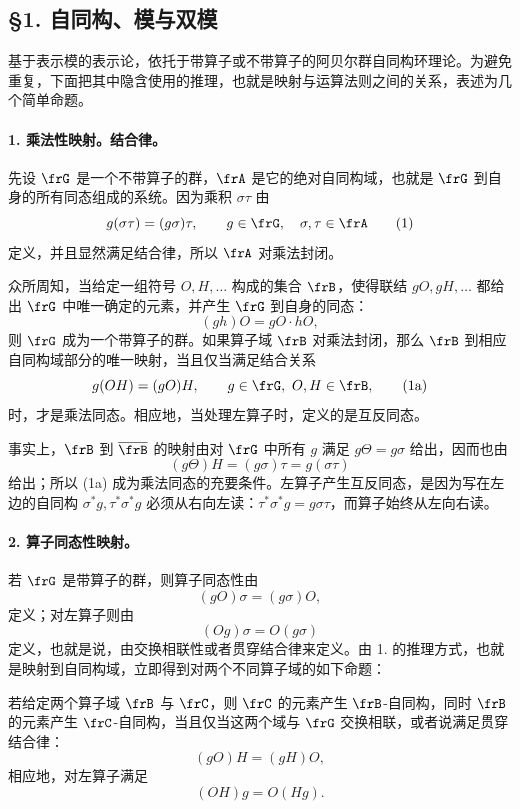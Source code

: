\subsection*{§1. 自同构、模与双模}

基于表示模的表示论，依托于带算子或不带算子的阿贝尔群自同构环理论。为避免重复，下面把其中隐含使用的推理，也就是映射与运算法则之间的关系，表述为几个简单命题。

\paragraph{1. 乘法性映射。结合律。}
先设 \(\frG\) 是一个不带算子的群，\(\frA\) 是它的绝对自同构域，也就是 \(\frG\) 到自身的所有同态组成的系统。因为乘积 \(\sigma\tau\) 由
\[
        g(\sigma\tau)=(g\sigma)\tau,
        \qquad g\in\frG,\quad \sigma,\tau\in\frA                         \tag{1}
\]
定义，并且显然满足结合律，所以 \(\frA\) 对乘法封闭。

众所周知，当给定一组符号 \(O,H,\ldots\) 构成的集合 \(\frB\)，使得联结 \(gO,gH,\ldots\) 都给出 \(\frG\) 中唯一确定的元素，并产生 \(\frG\) 到自身的同态：
\[
        (gh)O=gO\cdot hO ,
\]
则 \(\frG\) 成为一个带算子的群。如果算子域 \(\frB\) 对乘法封闭，那么 \(\frB\) 到相应自同构域部分的唯一映射，当且仅当满足结合关系
\[
        g(OH)=(gO)H, \qquad g\in\frG,\ O,H\in\frB,                       \tag{1a}
\]
时，才是乘法同态。相应地，当处理左算子时，定义的是互反同态。

事实上，\(\frB\) 到 \(\overline{\frB}\) 的映射由对 \(\frG\) 中所有 \(g\) 满足 \(g\Theta=g\sigma\) 给出，因而也由
\[
        (g\Theta)H=(g\sigma)\tau=g(\sigma\tau)
\]
给出；所以 (1a) 成为乘法同态的充要条件。左算子产生互反同态，是因为写在左边的自同构 \(\sigma^\ast g,\tau^\ast\sigma^\ast g\) 必须从右向左读：\(\tau^\ast\sigma^\ast g=g\sigma\tau\)，而算子始终从左向右读。

\paragraph{2. 算子同态性映射。}
若 \(\frG\) 是带算子的群，则算子同态性由
\[
        (gO)\sigma=(g\sigma)O,                                          \tag{2}
\]
定义；对左算子则由
\[
        (Og)\sigma=O(g\sigma)                                           \tag{2*}
\]
定义，也就是说，由交换相联性或者贯穿结合律来定义。由 1. 的推理方式，也就是映射到自同构域，立即得到对两个不同算子域的如下命题：

若给定两个算子域 \(\frB\) 与 \(\frC\)，则 \(\frC\) 的元素产生 \(\frB\)-自同构，同时 \(\frB\) 的元素产生 \(\frC\)-自同构，当且仅当这两个域与 \(\frG\) 交换相联，或者说满足贯穿结合律：
\[
        (gO)H=(gH)O,                                                    \tag{2a}
\]
相应地，对左算子满足
\[
        (OH)g=O(Hg).                                                    \tag{2a*}
\]

